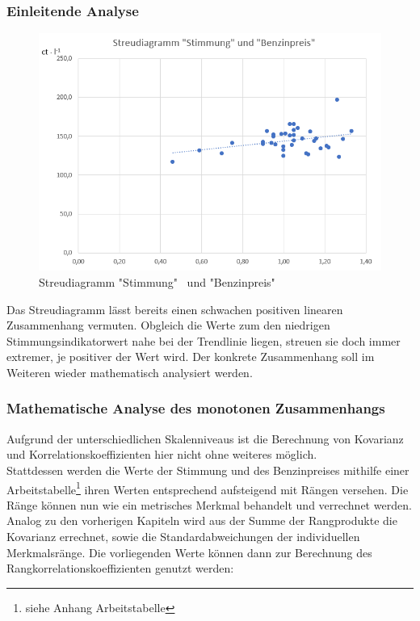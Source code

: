 \subsubsection{Einleitende Analyse}
\begin{figure}[H]
  \centering
  \includegraphics[width = \textwidth]{graphics/streustimbenz.png}
  \caption{Streudiagramm "Stimmung" \, und "Benzinpreis"}
  \label{fig:streuStimBenz}
\end{figure}
Das Streudiagramm lässt bereits einen schwachen positiven linearen Zusammenhang vermuten. Obgleich die Werte zum den niedrigen Stimmungsindikatorwert nahe bei der Trendlinie liegen, streuen sie doch immer extremer, je positiver der Wert wird. Der konkrete Zusammenhang soll im Weiteren wieder mathematisch analysiert werden.

\subsubsection{Mathematische Analyse des monotonen Zusammenhangs}
Aufgrund der unterschiedlichen Skalenniveaus ist die Berechnung von Kovarianz und Korrelationskoeffizienten hier nicht ohne weiteres möglich.\\
Stattdessen werden die Werte der Stimmung und des Benzinpreises mithilfe einer Arbeitstabelle\footnote{siehe Anhang Arbeitstabelle } ihren Werten entsprechend aufsteigend mit Rängen versehen. Die Ränge können nun wie ein metrisches Merkmal behandelt und verrechnet werden.\\
Analog zu den vorherigen Kapiteln wird aus der Summe der Rangprodukte die Kovarianz errechnet, sowie die Standardabweichungen der individuellen Merkmalsränge. Die vorliegenden Werte können dann zur Berechnung des Rangkorrelationskoeffizienten genutzt werden:

